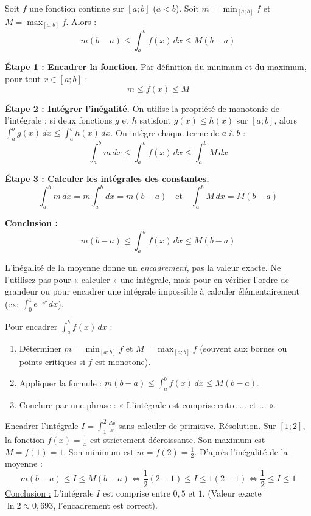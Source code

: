 \documentclass[11pt]{article}
\begin{document}
\begin{propriete}
Soit $f$ une fonction continue sur $[a;b]$ ($a<b$). Soit $m = \min_{[a;b]} f$ et $M = \max_{[a;b]} f$. Alors :
\[
m(b-a) \le \int_a^b f(x)\,dx \le M(b-a)
\]
\end{propriete}

\begin{experience}
\textbf{Étape 1 : Encadrer la fonction.} Par définition du minimum et du maximum, pour tout $x \in [a;b]$ :
\[
m \le f(x) \le M
\]

\textbf{Étape 2 : Intégrer l'inégalité.} On utilise la propriété de monotonie de l'intégrale : si deux fonctions $g$ et $h$ satisfont $g(x) \le h(x)$ sur $[a;b]$, alors $\int_a^b g(x)\,dx \le \int_a^b h(x)\,dx$. On intègre chaque terme de $a$ à $b$ :
\[
\int_a^b m\,dx \le \int_a^b f(x)\,dx \le \int_a^b M\,dx
\]

\textbf{Étape 3 : Calculer les intégrales des constantes.}
\[
\int_a^b m\,dx = m \int_a^b dx = m(b-a) \quad\text{et}\quad \int_a^b M\,dx = M(b-a)
\]

\textbf{Conclusion :}
\[
m(b-a) \le \int_a^b f(x)\,dx \le M(b-a)
\]
\end{experience}

\begin{attention}
L'inégalité de la moyenne donne un \emph{encadrement}, pas la valeur exacte. Ne l'utilisez pas pour « calculer » une intégrale, mais pour en vérifier l'ordre de grandeur ou pour encadrer une intégrale impossible à calculer élémentairement (ex: $\int_0^1 e^{-x^2}dx$).
\end{attention}

\begin{methode}
Pour encadrer $\int_a^b f(x)\,dx$ :
\begin{enumerate}
    \item Déterminer $m = \min_{[a;b]} f$ et $M = \max_{[a;b]} f$ (souvent aux bornes ou points critiques si $f$ est monotone).
    \item Appliquer la formule : $m(b-a) \le \int_a^b f(x)\,dx \le M(b-a)$.
    \item Conclure par une phrase : « L'intégrale est comprise entre ... et ... ».
\end{enumerate}
\end{methode}

\begin{exoresolu}
Encadrer l'intégrale $I = \int_1^2 \frac{dx}{x}$ sans calculer de primitive.
\tcblower
\underline{Résolution.}
Sur $[1;2]$, la fonction $f(x)=\frac{1}{x}$ est strictement décroissante.
Son maximum est $M = f(1) = 1$.
Son minimum est $m = f(2) = \frac{1}{2}$.
D'après l'inégalité de la moyenne :
\[
m(b-a) \le I \le M(b-a) \iff \frac{1}{2}(2-1) \le I \le 1(2-1) \iff \frac{1}{2} \le I \le 1
\]
\underline{Conclusion :} L'intégrale $I$ est comprise entre $0,5$ et $1$. (Valeur exacte $\ln 2 \approx 0,693$, l'encadrement est correct).

\end{exoresolu}
\end{document}
